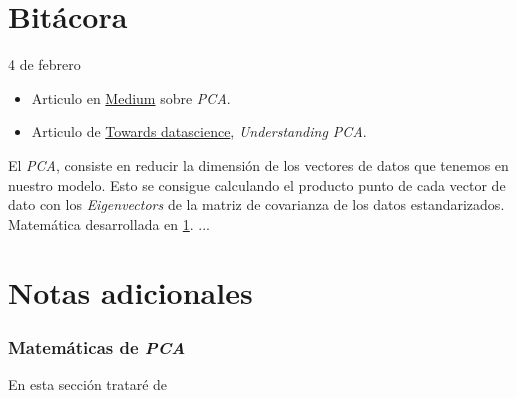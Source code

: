 
\maketitle

\part{Bitácora}
\begin{entry}{4 de febrero}
\tcbsubtitle{\LBlimportant}
\begin{itemize}
    \item Articulo en \href{https://medium.com/codex/principal-component-analysis-pca-how-it-works-mathematically-d5de4c7138e6}{Medium} sobre \textit{PCA}.
    
    \item Articulo de \href{https://towardsdatascience.com/understanding-pca-fae3e243731d}{Towards datascience}, \textit{Understanding PCA}.
\end{itemize}
\tcblower
\tcbsubtitle{\LBlsummary}
El \textit{PCA}, consiste en reducir la dimensión de los vectores de datos que tenemos en nuestro modelo. Esto se consigue calculando el producto punto de cada vector de dato con los \textit{Eigenvectors} de la matriz de covarianza de los datos estandarizados. Matemática desarrollada en \ref{PCAmath}.
\vspace{0.4em}
\tcbsubtitle{\LBltodo}
...
\end{entry}

\newpage

\part{Notas adicionales}
\section{Matemáticas de \textit{PCA}}\label{PCAmath}
En esta sección trataré de 
